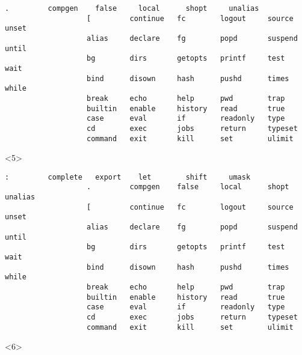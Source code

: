 \begin{frame}
\begin{overlayarea}{\textwidth}{0.7\textheight}
\begin{onlyenv}
\begin{onlyenv}
\begin{lstlisting}[style=MyBash, numbers=none, keywordstyle=\color{builtins-color},]
                   .         compgen    false     local      shopt     unalias
                   [         continue   fc        logout     source    unset  
                   alias     declare    fg        popd       suspend   until  
                   bg        dirs       getopts   printf     test      wait   
                   bind      disown     hash      pushd      times     while  
                   break     echo       help      pwd        trap      
                   builtin   enable     history   read       true      
                   case      eval       if        readonly   type      
                   cd        exec       jobs      return     typeset   
                   command   exit       kill      set        ulimit    
                \end{lstlisting}
            \end{onlyenv}
            \begin{onlyenv}<5>
                \begin{lstlisting}[style=MyBash, numbers=none, deleteemph={[5]:,.,[,alias, bg, break, case, cd, continue, declare, echo, eval, exec, exit, export, false, fg, help, if, jobs, kill, let, local,printf, pwd, read, readonly, return, set, shift, source, test, true, unalias, unset, until, wait, while}, emph={[7]:,.,[,alias, bg, break, case, cd, continue, declare, echo, eval, exec, exit, export,false, fg, help, if, jobs, kill, let, local,printf, pwd, read, readonly, return, set, shift, source, test, true, unalias, unset, until, wait, while}, emphstyle={[7]\color{PP}}]
                   :         complete   export    let        shift     umask  
                   .         compgen    false     local      shopt     unalias
                   [         continue   fc        logout     source    unset  
                   alias     declare    fg        popd       suspend   until  
                   bg        dirs       getopts   printf     test      wait   
                   bind      disown     hash      pushd      times     while  
                   break     echo       help      pwd        trap      
                   builtin   enable     history   read       true      
                   case      eval       if        readonly   type      
                   cd        exec       jobs      return     typeset   
                   command   exit       kill      set        ulimit    
                \end{lstlisting}
            \end{onlyenv}
            \begin{onlyenv}<6>

\end{onlyenv}
\end{onlyenv}
\end{overlayarea}
\end{frame}
